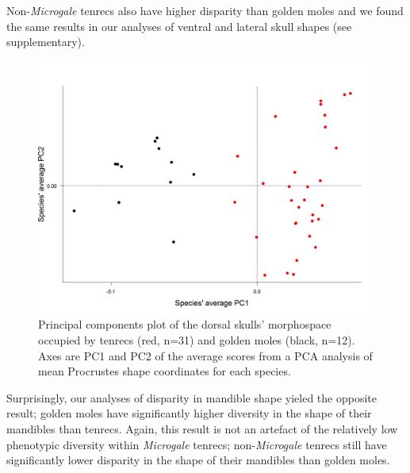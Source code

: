 \documentclass[12pt,a4paper]{article}
\begin{document}
Non-\textit{Microgale} tenrecs also have higher disparity than golden moles and we found the same results in our analyses of ventral and lateral skull shapes (see supplementary).



	
\begin{figure}[H]
\centering
\includegraphics[width=1\linewidth]{SkDors_Tenrecs+Gmoles_PC1PC2_01_05.jpg}
\caption{Principal components plot of the dorsal skulls' morphospace occupied by tenrecs (red, n=31) and golden moles (black, n=12). Axes are PC1 and PC2 of the average scores from a PCA analysis of mean Procrustes shape coordinates for each species. }
\label{skdorsPCA}
\end{figure}


Surprisingly, our analyses of disparity in mandible shape yieled the opposite result; golden moles have significantly higher diversity in the shape of their mandibles than tenrecs.  
Again, this result is not an artefact of the relatively low phenotypic diversity within \textit{Microgale} tenrecs; non-\textit{Microgale} tenrecs still have significantly lower disparity in the shape of their mandibles than golden moles.
\end{document}
